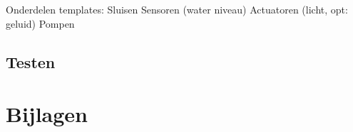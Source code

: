 \documentclass{article}
\begin{document}
Onderdelen templates: \newline
Sluisen \newline
Sensoren (water niveau) \newline
Actuatoren (licht, opt: geluid) \newline
Pompen


\subsection{Testen}

\section{Bijlagen}
\newpage


\end{document}
